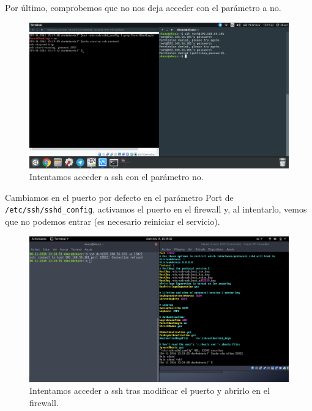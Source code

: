 \begin{flushleft}
Por último, comprobemos que no nos deja acceder con el parámetro a no.
\begin{figure}[H]
	\centering
	\includegraphics[scale=0.3]{rootno.png}
	\caption{Intentamos acceder a ssh con el parámetro no.}
\end{figure}


Cambiamos en el puerto por defecto en el parámetro Port de \verb|/etc/ssh/sshd_config|, activamos el puerto en el firewall y, al intentarlo, vemos que no podemos entrar (es necesario reiniciar el servicio).
\begin{figure}[H]
	\centering
	\includegraphics[scale=0.3]{servicioSinReiniciar.png}
	\caption{Intentamos acceder a ssh tras modificar el puerto y abrirlo en el firewall.}
\end{figure}


\end{flushleft}
